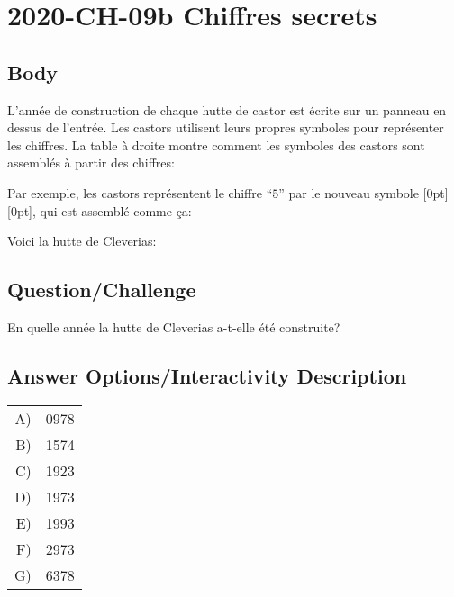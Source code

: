 \documentclass[a4paper,11pt]{report}
\newcommand{\taskGraphicsFolder}{..}
\begin{document}
\section*{\centering{} 2020-CH-09b Chiffres secrets}


\subsection*{Body}

L’année de construction de chaque hutte de castor est écrite sur un panneau en dessus de l’entrée. Les castors utilisent leurs propres symboles pour représenter les chiffres. La table à droite montre comment les symboles des castors sont assemblés à partir des chiffres:

{\centering%
\par}

Par exemple, les castors représentent le chiffre “$5$” par le nouveau symbole \raisebox{-0.5ex}[0pt][0pt]{}, qui est assemblé comme ça:

{\centering%
\par}

Voici la hutte de Cleverias:

{\centering%
\par}

{\em

\subsection*{Question/Challenge}

En quelle année la hutte de Cleverias a-t-elle été construite?

}\begingroup
\renewcommand{\arraystretch}{1.5}
\subsection*{Answer Options/Interactivity Description}

\begin{tabular}{ @{} r l @{} }
  A) & 0978 \\ 
  B) & 1574 \\ 
  C) & 1923 \\ 
  D) & 1973 \\ 
  E) & 1993 \\ 
  F) & 2973 \\ 
  G) & 6378
\end{tabular}
\end{document}

